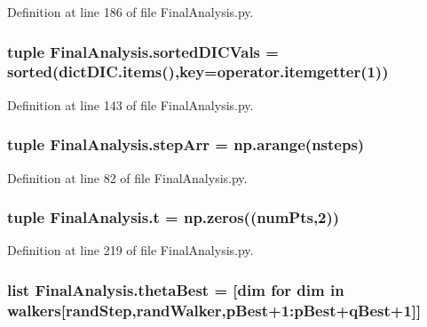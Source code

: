 Definition at line 186 of file Final\-Analysis.\-py.

\hypertarget{namespace_final_analysis_ac46e153da6c229304def2ef1594ad6d0}{
\subsubsection[{sorted\-D\-I\-C\-Vals}]{\setlength{\rightskip}{0pt plus 5cm}tuple Final\-Analysis.\-sorted\-D\-I\-C\-Vals = sorted(dict\-D\-I\-C.\-items(),key=operator.\-itemgetter(1))}}\label{namespace_final_analysis_ac46e153da6c229304def2ef1594ad6d0}


Definition at line 143 of file Final\-Analysis.\-py.

\hypertarget{namespace_final_analysis_a221de63368631e4bf8a334f9f0b4fcdb}{
\subsubsection[{step\-Arr}]{\setlength{\rightskip}{0pt plus 5cm}tuple Final\-Analysis.\-step\-Arr = np.\-arange({\bf nsteps})}}\label{namespace_final_analysis_a221de63368631e4bf8a334f9f0b4fcdb}


Definition at line 82 of file Final\-Analysis.\-py.

\hypertarget{namespace_final_analysis_a90758b7deb047594ad04ead892b7627e}{
\subsubsection[{t}]{\setlength{\rightskip}{0pt plus 5cm}tuple Final\-Analysis.\-t = np.\-zeros(({\bf num\-Pts},2))}}\label{namespace_final_analysis_a90758b7deb047594ad04ead892b7627e}


Definition at line 219 of file Final\-Analysis.\-py.

\hypertarget{namespace_final_analysis_ae73eb98f29c137ecea3dc1021ba665b5}{
\subsubsection[{theta\-Best}]{\setlength{\rightskip}{0pt plus 5cm}list Final\-Analysis.\-theta\-Best = \mbox{[}dim for dim in {\bf walkers}\mbox{[}{\bf rand\-Step},{\bf rand\-Walker},{\bf p\-Best}+1\-:{\bf p\-Best}+{\bf q\-Best}+1\mbox{]}\mbox{]}}}\label{namespace_final_analysis_ae73eb98f29c137ecea3dc1021ba665b5}


